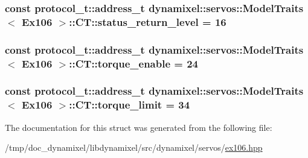 \subsubsection[{\texorpdfstring{status\+\_\+return\+\_\+level}{status_return_level}}]{\setlength{\rightskip}{0pt plus 5cm}const {\bf protocol\+\_\+t\+::address\+\_\+t} {\bf dynamixel\+::servos\+::\+Model\+Traits}$<$ {\bf Ex106} $>$\+::C\+T\+::status\+\_\+return\+\_\+level = 16\hspace{0.3cm}{\ttfamily [static]}}\hypertarget{structdynamixel_1_1servos_1_1_model_traits_3_01_ex106_01_4_1_1_c_t_a18861e77deef66e012ba2ac1375e55b0}{}\label{structdynamixel_1_1servos_1_1_model_traits_3_01_ex106_01_4_1_1_c_t_a18861e77deef66e012ba2ac1375e55b0}
\subsubsection[{\texorpdfstring{torque\+\_\+enable}{torque_enable}}]{\setlength{\rightskip}{0pt plus 5cm}const {\bf protocol\+\_\+t\+::address\+\_\+t} {\bf dynamixel\+::servos\+::\+Model\+Traits}$<$ {\bf Ex106} $>$\+::C\+T\+::torque\+\_\+enable = 24\hspace{0.3cm}{\ttfamily [static]}}\hypertarget{structdynamixel_1_1servos_1_1_model_traits_3_01_ex106_01_4_1_1_c_t_acacef52f197552ea986e90a3c352277b}{}\label{structdynamixel_1_1servos_1_1_model_traits_3_01_ex106_01_4_1_1_c_t_acacef52f197552ea986e90a3c352277b}
\subsubsection[{\texorpdfstring{torque\+\_\+limit}{torque_limit}}]{\setlength{\rightskip}{0pt plus 5cm}const {\bf protocol\+\_\+t\+::address\+\_\+t} {\bf dynamixel\+::servos\+::\+Model\+Traits}$<$ {\bf Ex106} $>$\+::C\+T\+::torque\+\_\+limit = 34\hspace{0.3cm}{\ttfamily [static]}}\hypertarget{structdynamixel_1_1servos_1_1_model_traits_3_01_ex106_01_4_1_1_c_t_a0cf899dd3bc22ec35575ff77cd16754a}{}\label{structdynamixel_1_1servos_1_1_model_traits_3_01_ex106_01_4_1_1_c_t_a0cf899dd3bc22ec35575ff77cd16754a}


The documentation for this struct was generated from the following file\+:\begin{DoxyCompactItemize}
\item 
/tmp/doc\+\_\+dynamixel/libdynamixel/src/dynamixel/servos/\hyperlink{ex106_8hpp}{ex106.\+hpp}\end{DoxyCompactItemize}
